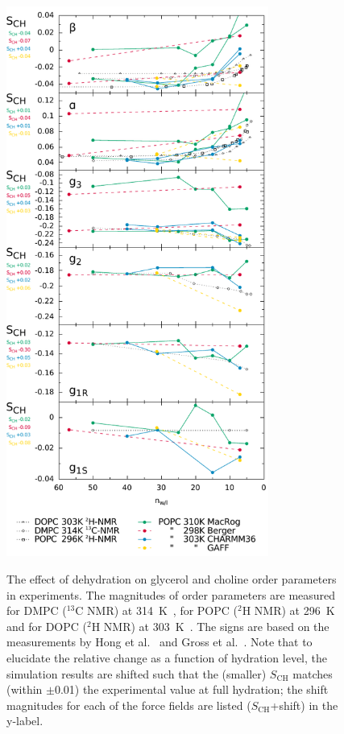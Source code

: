 \documentclass[journal=jacsat,manuscript=article]{achemso}
\begin{document}
\begin{figure}[]
  \centering
  \includegraphics[width=8.6cm]{../DATAreportediINblog/dehydration.pdf}
   \\
  \caption{\label{ordPhydr}
    The effect of dehydration on glycerol and choline order parameters in experiments.
    The magnitudes of order parameters are measured for DMPC ($^{13}$C NMR) at 314~K~\cite{dvinskikh05b}, 
    for POPC ($^2$H NMR) at 296~K~\cite{bechinger91} and for DOPC ($^2$H NMR) at 303~K~\cite{ulrich94}. 
    The signs are based on the measurements by Hong et al.~\cite{hong95a,hong95b} 
    and Gross et al.~\cite{gross97}.
    Note that to elucidate the relative change as a function of hydration level,
    the simulation results are shifted such that the (smaller) $S_\mathrm{CH}$
    matches (within $\pm$0.01) the experimental value at full hydration;
    the shift magnitudes for each of the force fields are listed ($S_\mathrm{CH}$+shift) in the y-label.
  }
\end{figure}
\end{document}
